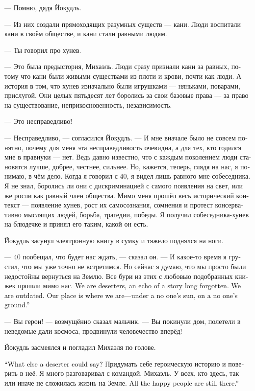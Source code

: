 \documentclass[a4paper,12pt,fleqn]{book}\usepackage{cooltooltips}\usepackage{polyglossia}\setdefaultlanguage[babelshorthands=true]{russian}\setotherlanguage{english}\defaultfontfeatures{Ligatures=TeX,Mapping=tex-text} \usepackage{xcolor}\definecolor{lightgray}{HTML}{bbbbbb}\color{lightgray}\newcommand{\ml}[3]{\textenglish{\textcolor{black}{#3}}}
\begin{document}
--- Помню, дядя Йокудль.

--- Из них создали прямоходящих разумных существ --- кани.
Люди воспитали кани в своём обществе, и кани стали равными людям.

--- Ты говорил про хунев.

--- Это была предыстория, Михаэль.
Люди сразу признали кани за равных, потому что кани были живыми существами из плоти и крови, почти как люди.
А история в том, что хунев изначально были игрушками --- няньками, поварами, прислугой.
Они целых пятьдесят лет боролись за свои базовые права --- за право на существование, неприкосновенность, независимость.

--- Это несправедливо!

--- Несправедливо, --- согласился Йокудль.
--- И мне вначале было не совсем понятно, почему для меня эта несправедливость очевидна, а для тех, кто годился мне в правнуки --- нет.
Ведь давно известно, что с каждым поколением люди становятся лучше, добрее, честнее, сильнее.
Но, кажется, теперь, глядя на нас, я понимаю, в чём дело.
Когда я говорил с 40, я видел лишь равного мне собеседника.
Я не знал, боролись ли они с дискриминацией с самого появления на свет, или же росли как равный член общества.
Мимо меня прошёл весь исторический контекст --- появление хунев, рост их самосознания, сомнения и протест консервативно мыслящих людей, борьба, трагедии, победы.
Я получил собеседника-хунев на блюдечке и принял его таким, какой он есть.

Йокудль засунул электронную книгу в сумку и тяжело поднялся на ноги.

--- 40 пообещал, что будет нас ждать, --- сказал он.
--- И какое-то время я грустил, что мы уже точно не встретимся.
Но сейчас я думаю, что мы просто были недостойны вернуться на Землю.
Все бури из этих с любовью подобранных книжек прошли мимо нас.
\ml{$0$}
{Мы --- дезертиры, отголосок давно забытой истории.}
{We are deserters, an echo of a story long forgotten.}
\ml{$0$}
{Мы устарели.}
{We are outdated.}
\ml{$0$}
{И наше место --- там, где мы есть, под ничьим солнцем, на ничьей земле.}
{Our place is where we are---under a no one's sun, on a no one's ground.''}

--- Вы герои! --- возмущённо сказал мальчик.
--- Вы покинули дом, полетели в неведомые дали космоса, продвинули человечество вперёд!

Йокудль засмеялся и погладил Михаэля по голове.

\ml{$0$}
{--- Что ещё может сделать дезертир?}
{``What else a deserter could say?}
Придумать себе героическую историю и поверить в неё.
Я много разговаривал с командой, Михаэль.
У всех, кто здесь, так или иначе не сложилась жизнь на Земле.
\ml{$0$}
{Все счастливые остались там.}
{All the happy people are still there.''}
\end{document}
